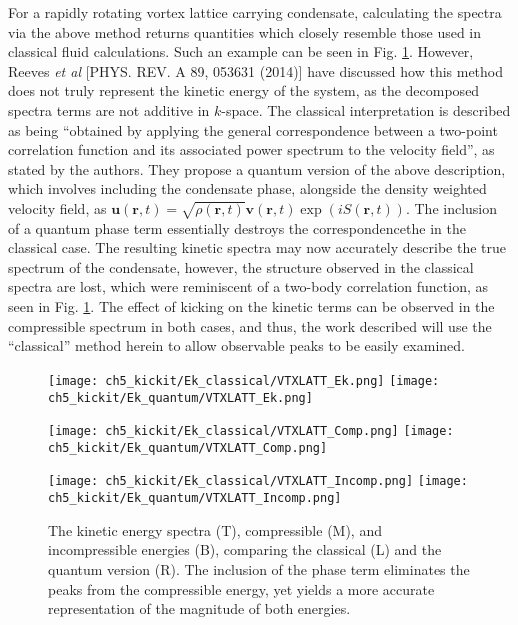 For a rapidly rotating vortex lattice carrying condensate, calculating the spectra via the above method returns quantities which closely resemble those used in classical fluid calculations. Such an example can be seen in Fig. \ref{fig:ek_clvqu}. However, Reeves {\it et al} [PHYS. REV. A 89, 053631 (2014)] have discussed how this method does not truly represent the kinetic energy of the system, as the decomposed spectra terms are not additive in $k$-space. The classical interpretation is described as being ``obtained by applying the general correspondence between a two-point correlation function and its associated
power spectrum to the velocity field'', as stated by the authors. They propose a quantum version of the above description, which involves including the condensate phase, alongside the density weighted velocity field, as $\mathbf{u}(\mathbf{r},t) = \sqrt{\rho(\mathbf{r},t)}\mathbf{v}(\mathbf{r},t)\exp\left(iS(\mathbf{r},t)\right)$. The inclusion of a quantum phase term essentially destroys the correspondencethe in the classical case. The resulting kinetic spectra may now accurately describe the true spectrum of the condensate, however, the structure observed in the classical spectra are lost, which were reminiscent of a two-body correlation function, as seen in Fig. \ref{fig:ek_clvqu}. The effect of kicking on the kinetic terms can be observed in the compressible spectrum in both cases, and thus, the work described will use the ``classical'' method herein to allow observable peaks to be easily examined.

\begin{figure}[tb]
    \centering
    \texttt{[image: ch5\_kickit/Ek\_classical/VTXLATT\_Ek.png]}
    \texttt{[image: ch5\_kickit/Ek\_quantum/VTXLATT\_Ek.png]}

    \texttt{[image: ch5\_kickit/Ek\_classical/VTXLATT\_Comp.png]}
    \texttt{[image: ch5\_kickit/Ek\_quantum/VTXLATT\_Comp.png]}

    \texttt{[image: ch5\_kickit/Ek\_classical/VTXLATT\_Incomp.png]}
    \texttt{[image: ch5\_kickit/Ek\_quantum/VTXLATT\_Incomp.png]}

\caption[Kinetic energy spectra with and without quantum phase.]{The kinetic energy spectra (T), compressible (M), and incompressible energies (B), comparing the classical (L) and the quantum version (R). The inclusion of the phase term eliminates the peaks from the compressible energy, yet yields a more accurate representation of the magnitude of both energies.}
\label{fig:ek_clvqu}
\end{figure}



